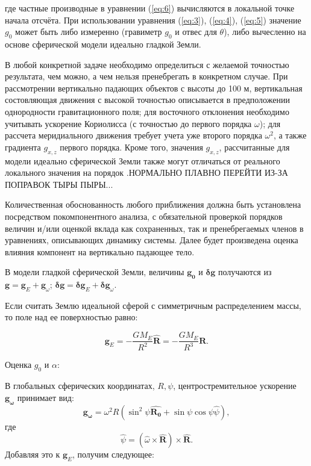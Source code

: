 \documentclass[hoptionsi, twocolumn]{revtex4-2}
\begin{document}
где частные производные в уравнении (\ref{eq:6}) вычисляются в локальной точке начала отсчёта.  При использовании уравнения (\ref{eq:3}), (\ref{eq:4}), (\ref{eq:5}) значение $g_0$ может быть либо измеренно (гравиметр $g_0$ и отвес для $\theta$), либо вычесленно на основе сферической модели идеально гладкой Земли.

В любой конкретной задаче необходимо определиться с желаемой точностью результата, чем можно, а чем нельзя пренебрегать в конкретном случае. При рассмотрении вертикально падающих объектов с высоты до 100 м, вертикальная состовляющая движения с высокой точностью описывается в предположении однородности гравитационного поля; для восточного отклонения необходимо учитывать ускорение Кориолисса (с точностью до первого порядка $\omega$); для рассчета меридиального движения требует учета уже второго порядка $\omega^2$, а также градиента $g_{x,z}$ первого порядка. Кроме того, значения $g_{x,z}$, рассчитанные для модели идеально сферической Земли также могут отличаться от реального локального значения на порядок \cite{4}.НОРМАЛЬНО ПЛАВНО ПЕРЕЙТИ
ИЗ-ЗА ПОПРАВОК ТЫРЫ ПЫРЫ...

Количественная обоснованность любого приближения должна быть установлена посредством покомпонентного анализа, с обязательной проверкой порядков величин и/или оценкой вклада как сохраненных, так и пренебрегаемых членов в уравнениях, описывающих динамику системы. Далее будет произведена оценка влияния компонент на вертикально падающее тело.


В модели гладкой сферической Земли, величины $\bm{g_0}$ и $\bm{\delta g}$ получаются из $\bm{g} = \bm{g}_E + \bm{g}_{\omega}$; $\bm{\delta g} = \bm{\delta g}_E + \bm{\delta g}_{\omega}$.

Если считать Землю идеальной сферой с симметричным распределением массы, то поле над ее поверхностью равно:

\begin{equation}
    \boldsymbol{g}_E = -\dfrac{GM_E}{R^2}\hat{\mathbf{R}} = -\dfrac{GM_E}{R^3}{\mathbf{R}}.\label{eq:9}
\end{equation}

Оценка $g_0$ и $\alpha$:

В глобальных сферических координатах, $R, \psi$, центростремительное ускорение  $\bm{g_{\omega}}$  принимает вид:
\begin{equation}
    \bm{g_{\omega}}=\omega^2R(\sin^2{\psi} \boldsymbol{\hat{R_0}}  + \sin{\psi}\cos{\psi}\hat{\psi}),
\end{equation}
 где 
\begin{equation*}
    \hat{\psi} = (\hat{\omega}\times\bm{\hat{R}})\times\bm{\hat{R}}.
\end{equation*} Добавляя это к $\bm{g}_E$, получим следующее:
\end{document}
